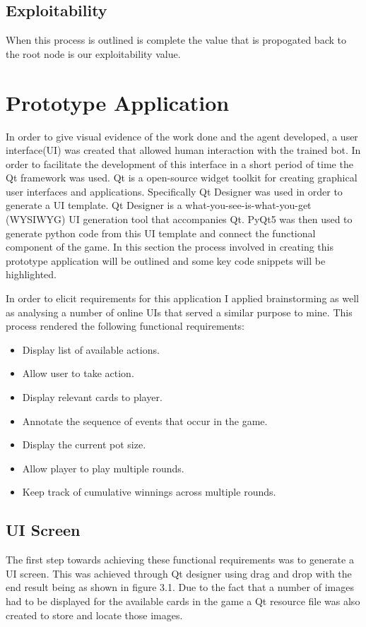 \subsection{Exploitability}\label{subsec:exploitability}
When this process is outlined is complete the value that is propogated back to the
root node is our exploitability value.

\section{Prototype Application}\label{sec:prototypeApp}
In order to give visual evidence of the work done and the agent developed, a user interface(UI) was created
that allowed human interaction with the trained bot.
In order to facilitate the development of this interface in a short period of time the Qt framework was used.
Qt is a open-source widget toolkit for creating graphical user interfaces and applications.
Specifically Qt Designer was used in order to generate a UI template.
Qt Designer is a what-you-see-is-what-you-get (WYSIWYG) UI generation tool that accompanies Qt.
PyQt5 was then used to generate python code from this UI template and connect the functional component of the game.
In this section the process involved in creating this prototype application will be outlined
and some key code snippets will be highlighted.

In order to elicit requirements for this application I applied brainstorming as well as analysing a number
of online UIs that served a similar purpose to mine.
This process rendered the following functional requirements:
\begin{itemize}
    \item Display list of available actions.
    \item Allow user to take action.
    \item Display relevant cards to player.
    \item Annotate the sequence of events that occur in the game.
    \item Display the current pot size.
    \item Allow player to play multiple rounds.
    \item Keep track of cumulative winnings across multiple rounds.
\end{itemize}

\subsection{UI Screen}\label{subsec:UiScreen}
The first step towards achieving these functional requirements was to generate a UI screen.
This was achieved through Qt designer using drag and drop with the end result being as shown in figure 3.1.
Due to the fact that a number of images had to be displayed for the available cards in the
game a Qt resource file was also created to store and locate those images.

